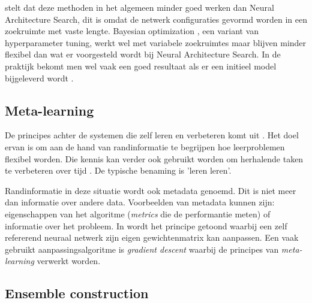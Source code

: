 \textcite{ZophL2016} stelt dat deze methoden in het algemeen minder goed werken dan Neural Architecture Search, dit is omdat de netwerk configuraties gevormd worden in een zoekruimte met vaste lengte. Bayesian optimization \autocite{Bergstra2013}, een variant van hyperparameter tuning, werkt wel met variabele zoekruimtes maar blijven minder flexibel dan wat er voorgesteld wordt bij Neural Architecture Search. In de praktijk bekomt men wel vaak een goed resultaat als er een initieel model bijgeleverd wordt \autocite{ZophL2016}.

\subsection{Meta-learning}
\label{subsec:meta-learning}

De principes achter de systemen die zelf leren en verbeteren komt uit \textcite{Schmid1987}. Het doel ervan is om aan de hand van randinformatie te begrijpen hoe leerproblemen flexibel worden. Die kennis kan verder ook gebruikt worden om herhalende taken te verbeteren over tijd \autocite{ZophL2016}. De typische benaming is 'leren leren'.

Randinformatie in deze situatie wordt ook metadata genoemd. Dit is niet meer dan informatie over andere data. Voorbeelden van metadata kunnen zijn: eigenschappen van het algoritme (\textit{metrics} die de performantie meten) of informatie over het probleem. In \textcite{Schmidhuber1993} wordt het principe getoond waarbij een zelf refererend neuraal netwerk zijn eigen gewichtenmatrix kan aanpassen. Een vaak gebruikt aanpassingsalgoritme is \textit{gradient descent} waarbij de principes van \textit{meta-learning} verwerkt worden.

\subsection{Ensemble construction}
\label{subsec:ensemble-construction}

